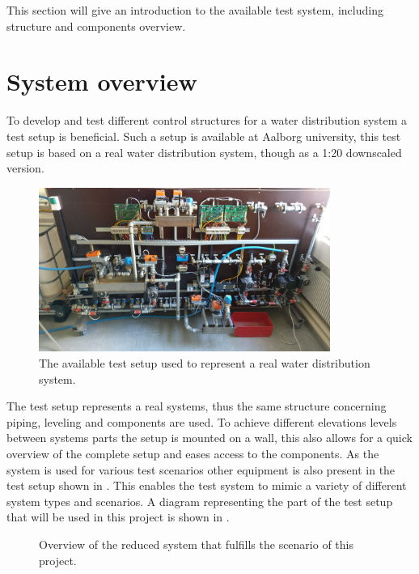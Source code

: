 This section will give an introduction to the available test system, including structure and components overview.  

\section{System overview}
\label{system_overview}
To develop and test different control structures for a water distribution system a test setup is beneficial.
Such a setup is available at Aalborg university, this test setup is based on a real water distribution system, though as a 1:20 downscaled version.

\begin{figure}[H]
\centering
\includegraphics[width=0.85\textwidth]{report/pictures/test_system_wide}
\caption{The available test setup used to represent a real water distribution system.}
\label{fig:test_setup}
\end{figure}


The test setup represents a real systems, thus the same structure concerning piping, leveling and components are used. To achieve different elevations levels between systems parts the setup is mounted on a wall, this also allows for a quick overview of the complete setup and eases access to the components. As the system is used for various test scenarios other equipment is also present in the test setup shown in . This enables the test system to mimic a variety of different system types and scenarios. A diagram representing the part of the test setup that will be used in this project is shown in . 

\begin{figure}[H]
\centering
 
\caption{Overview of the reduced system that fulfills the scenario of this project.}
\label{fig:sys_model_overview}
\end{figure}

